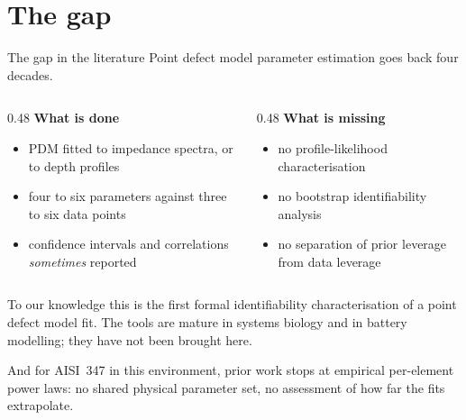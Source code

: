 \documentclass[aspectratio=169,10pt]{beamer}
\begin{document}
\section{The gap}

\begin{frame}{The gap in the literature}
Point defect model parameter estimation goes back four decades.

\vspace{0.7em}
\begin{columns}[T]
\begin{column}{0.48\textwidth}
\textbf{What is done}
\begin{itemize}\small
  \item PDM fitted to impedance spectra, or to depth profiles
  \item four to six parameters against three to six data points
  \item confidence intervals and correlations \emph{sometimes} reported
\end{itemize}
\end{column}
\begin{column}{0.48\textwidth}
\textbf{What is missing}
\begin{itemize}\small
  \item no profile-likelihood characterisation
  \item no bootstrap identifiability analysis
  \item no separation of prior leverage from data leverage
\end{itemize}
\end{column}
\end{columns}

\vspace{0.9em}
\begin{block}{}
To our knowledge this is the first formal identifiability
characterisation of a point defect model fit. The tools are mature in
systems biology and in battery modelling; they have not been brought
here.
\end{block}

\vspace{0.4em}
\scriptsize
And for AISI~347 in this environment, prior work stops at empirical
per-element power laws: no shared physical parameter set, no assessment
of how far the fits extrapolate.
\end{frame}

\end{document}
